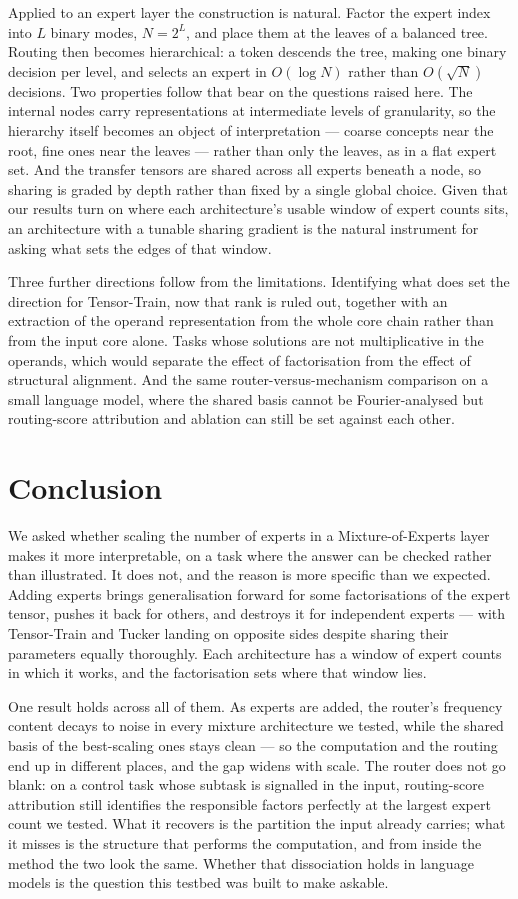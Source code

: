Applied to an expert layer the construction is natural. Factor the expert index
into $L$ binary modes, $N = 2^L$, and place them at the leaves of a balanced
tree. Routing then becomes hierarchical: a token descends the tree, making one
binary decision per level, and selects an expert in $O(\log N)$ rather than
$O(\sqrt{N})$ decisions. Two properties follow that bear on the questions
raised here. The internal nodes carry representations at intermediate levels of
granularity, so the hierarchy itself becomes an object of interpretation ---
coarse concepts near the root, fine ones near the leaves --- rather than only
the leaves, as in a flat expert set. And the transfer tensors are shared across
all experts beneath a node, so sharing is graded by depth rather than fixed by
a single global choice. Given that our results turn on where each
architecture's usable window of expert counts sits, an architecture with a
tunable sharing gradient is the natural instrument for asking what sets the
edges of that window.

Three further directions follow from the limitations. Identifying what does set the direction for Tensor-Train, now that rank is
ruled out, together with an extraction of the operand representation from the
whole core chain rather than from the input core alone. Tasks whose solutions are not
multiplicative in the operands, which would separate the effect of
factorisation from the effect of structural alignment. And the same
router-versus-mechanism comparison on a small language model, where the shared
basis cannot be Fourier-analysed but routing-score attribution and ablation can
still be set against each other.

\section{Conclusion}

We asked whether scaling the number of experts in a Mixture-of-Experts layer
makes it more interpretable, on a task where the answer can be checked rather
than illustrated. It does not, and the reason is more specific than we
expected. Adding experts brings generalisation forward for some factorisations
of the expert tensor, pushes it back for others, and destroys it for
independent experts --- with Tensor-Train and Tucker landing on opposite sides
despite sharing their parameters equally thoroughly. Each architecture has a
window of expert counts in which it works, and the factorisation sets where
that window lies.

One result holds across all of them. As experts are added, the router's
frequency content decays to noise in every mixture architecture we tested,
while the shared basis of the best-scaling ones stays clean --- so the
computation and the routing end up in different places, and the gap widens
with scale. The router does not go blank: on a control task whose subtask is
signalled in the input, routing-score attribution still identifies the
responsible factors perfectly at the largest expert count we tested. What it
recovers is the partition the input already carries; what it misses is the
structure that performs the computation, and from inside the method the two
look the same. Whether that dissociation holds in language models is the
question this testbed was built to make askable.